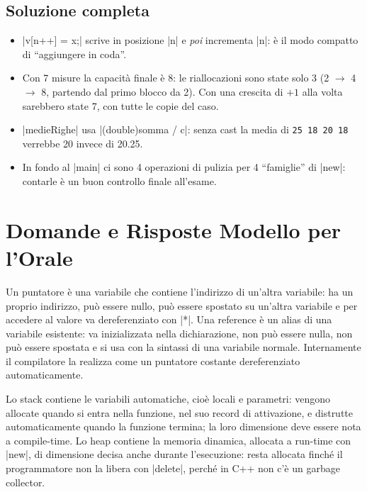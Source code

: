 \subsection*{Soluzione completa}

\begin{consiglio}
\begin{itemize}
  \item \cc|v[n++] = x;| scrive in posizione \cc|n| e \emph{poi} incrementa
        \cc|n|: è il modo compatto di ``aggiungere in coda''.
  \item Con 7 misure la capacità finale è 8: le riallocazioni sono state solo 3
        (2 $\to$ 4 $\to$ 8, partendo dal primo blocco da 2). Con una crescita di
        $+1$ alla volta sarebbero state 7, con tutte le copie del caso.
  \item \cc|medieRighe| usa \cc|(double)somma / c|: senza cast la media di
        \texttt{25 18 20 18} verrebbe 20 invece di 20.25.
  \item In fondo al \cc|main| ci sono 4 operazioni di pulizia per 4 ``famiglie''
        di \cc|new|: contarle è un buon controllo finale all'esame.
\end{itemize}
\end{consiglio}

\section{Domande e Risposte Modello per l'Orale}

\begin{orale}
Un puntatore è una variabile che contiene l'indirizzo di un'altra variabile: ha
un proprio indirizzo, può essere nullo, può essere spostato su un'altra variabile
e per accedere al valore va dereferenziato con \cc|*|. Una reference è un alias
di una variabile esistente: va inizializzata nella dichiarazione, non può essere
nulla, non può essere spostata e si usa con la sintassi di una variabile normale.
Internamente il compilatore la realizza come un puntatore costante dereferenziato
automaticamente.
\end{orale}

\begin{orale}
Lo stack contiene le variabili automatiche, cioè locali e parametri: vengono
allocate quando si entra nella funzione, nel suo record di attivazione, e
distrutte automaticamente quando la funzione termina; la loro dimensione deve
essere nota a compile-time. Lo heap contiene la memoria dinamica, allocata a
run-time con \cc|new|, di dimensione decisa anche durante l'esecuzione: resta
allocata finché il programmatore non la libera con \cc|delete|, perché in C++
non c'è un garbage collector.
\end{orale}

